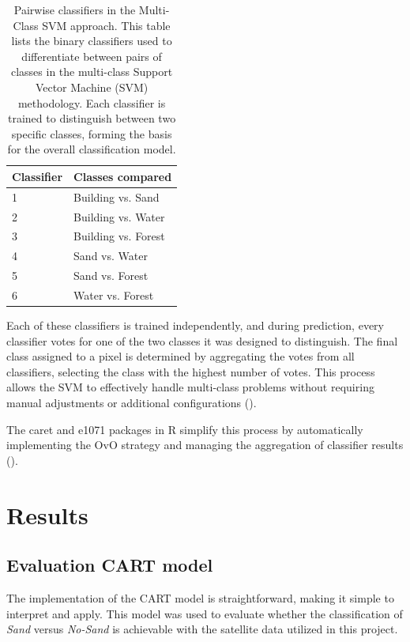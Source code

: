 \documentclass[a4paper,12pt]{article}
\begin{document}
\begin{table}[h]
\centering
\begin{tabular}{|p{3cm}|p{8cm}|}
\hline
\textbf{Classifier} & \textbf{Classes compared} \\ \hline
1 & Building vs. Sand \\ \hline
2 & Building vs. Water \\ \hline
3 & Building vs. Forest \\ \hline
4 & Sand vs. Water \\ \hline
5 & Sand vs. Forest \\ \hline
6 & Water vs. Forest \\ \hline
\end{tabular}
\caption[Pairwise classifiers in the Multi-Class SVM approach]{Pairwise classifiers in the Multi-Class SVM approach. This table lists the binary classifiers used to differentiate between pairs of classes in the multi-class Support Vector Machine (SVM) methodology. Each classifier is trained to distinguish between two specific classes, forming the basis for the overall classification model.}
\label{table1}
\end{table}


Each of these classifiers is trained independently, and during prediction, every classifier votes for one of the two classes it was designed to distinguish. The final class assigned to a pixel is determined by aggregating the votes from all classifiers, selecting the class with the highest number of votes. This process allows the SVM to effectively handle multi-class problems without requiring manual adjustments or additional configurations (\cite{mountrakis_support_2011}).

The caret and e1071 packages in R simplify this process by automatically implementing the OvO strategy and managing the aggregation of classifier results (\cite{xiao_enhancing_2021}).

\newpage
\section{Results}
\subsection{Evaluation CART model}
The implementation of the CART model is straightforward, making it simple to interpret and apply. This model was used to evaluate whether the classification of \textit{Sand} versus \textit{No-Sand} is achievable with the satellite data utilized in this project.
\end{document}
